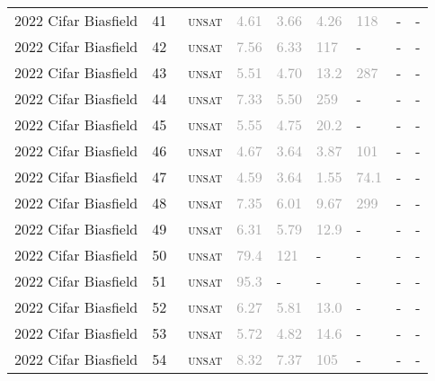 \begin{center}
{\begin{longtable}{@{}lllllllll@{}}
2022 Cifar Biasfield & 41 & ~\textsc{unsat} & \textcolor{darkgray}{4.61} & \textcolor{darkgray}{3.66} & \textcolor{darkgray}{4.26} & \textcolor{darkgray}{118} & - & - \\
2022 Cifar Biasfield & 42 & ~\textsc{unsat} & \textcolor{darkgray}{7.56} & \textcolor{darkgray}{6.33} & \textcolor{darkgray}{117} & - & - & - \\
2022 Cifar Biasfield & 43 & ~\textsc{unsat} & \textcolor{darkgray}{5.51} & \textcolor{darkgray}{4.70} & \textcolor{darkgray}{13.2} & \textcolor{darkgray}{287} & - & - \\
2022 Cifar Biasfield & 44 & ~\textsc{unsat} & \textcolor{darkgray}{7.33} & \textcolor{darkgray}{5.50} & \textcolor{darkgray}{259} & - & - & - \\
2022 Cifar Biasfield & 45 & ~\textsc{unsat} & \textcolor{darkgray}{5.55} & \textcolor{darkgray}{4.75} & \textcolor{darkgray}{20.2} & - & - & - \\
2022 Cifar Biasfield & 46 & ~\textsc{unsat} & \textcolor{darkgray}{4.67} & \textcolor{darkgray}{3.64} & \textcolor{darkgray}{3.87} & \textcolor{darkgray}{101} & - & - \\
2022 Cifar Biasfield & 47 & ~\textsc{unsat} & \textcolor{darkgray}{4.59} & \textcolor{darkgray}{3.64} & \textcolor{darkgray}{1.55} & \textcolor{darkgray}{74.1} & - & - \\
2022 Cifar Biasfield & 48 & ~\textsc{unsat} & \textcolor{darkgray}{7.35} & \textcolor{darkgray}{6.01} & \textcolor{darkgray}{9.67} & \textcolor{darkgray}{299} & - & - \\
2022 Cifar Biasfield & 49 & ~\textsc{unsat} & \textcolor{darkgray}{6.31} & \textcolor{darkgray}{5.79} & \textcolor{darkgray}{12.9} & - & - & - \\
2022 Cifar Biasfield & 50 & ~\textsc{unsat} & \textcolor{darkgray}{79.4} & \textcolor{darkgray}{121} & - & - & - & - \\
2022 Cifar Biasfield & 51 & ~\textsc{unsat} & \textcolor{darkgray}{95.3} & - & - & - & - & - \\
2022 Cifar Biasfield & 52 & ~\textsc{unsat} & \textcolor{darkgray}{6.27} & \textcolor{darkgray}{5.81} & \textcolor{darkgray}{13.0} & - & - & - \\
2022 Cifar Biasfield & 53 & ~\textsc{unsat} & \textcolor{darkgray}{5.72} & \textcolor{darkgray}{4.82} & \textcolor{darkgray}{14.6} & - & - & - \\
2022 Cifar Biasfield & 54 & ~\textsc{unsat} & \textcolor{darkgray}{8.32} & \textcolor{darkgray}{7.37} & \textcolor{darkgray}{105} & - & - & - \\

\end{longtable}}
\end{center}
